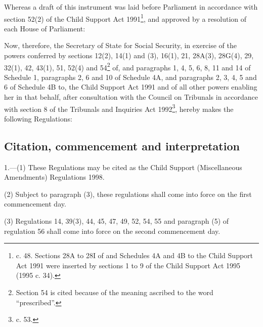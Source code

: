 \documentclass[12pt,a4paper]{article}
\title{\regstitle}
\author{S.I. 1998 No. 58}
\date{Made 15th January 1998\\Coming into force in accordance with regulation 1(2) and (3)}
\begin{document}
\maketitle

\noindent
Whereas a draft of this instrument was laid before Parliament in accordance with section 52(2) of the Child Support Act 1991\footnote{ c. 48. Sections 28A to 28I of and Schedules 4A and 4B to the Child Support Act 1991 were inserted by sections 1 to 9 of the Child Support Act 1995 (1995 c. 34).}, and approved by a resolution of each House of Parliament:

 Now, therefore, the Secretary of State for Social Security, in exercise of the powers conferred by sections 12(2), 14(1) and (3), 16(1), 21, 28A(3), 28G(4), 29, 32(1), 42, 43(1), 51, 52(4) and 54\footnote{\frenchspacing Section 54 is cited because of the meaning ascribed to the word “prescribed”.} of, and paragraphs 1, 4, 5, 6, 8, 11 and 14 of Schedule 1, paragraphs 2, 6 and 10 of Schedule 4A, and paragraphs 2, 3, 4, 5 and 6 of Schedule 4B to, the Child Support Act 1991 and of all other powers enabling her in that behalf, after consultation with the Council on Tribunals in accordance with section 8 of the Tribunals and Inquiries Act 1992\footnote{ c. 53.}, hereby makes the following Regulations:


{\sloppy

\tableofcontents

}

\bigskip

\setcounter{secnumdepth}{-2}

\subsection[1. Citation, commencement and interpretation]{Citation, commencement and interpretation}

1.—(1) These Regulations may be cited as the Child Support (Miscellaneous Amendments) Regulations 1998.

(2) Subject to paragraph (3), these regulations shall come into force on the first commencement day.

(3) Regulations 14, 39(3), 44, 45, 47, 49, 52, 54, 55 and paragraph (5) of regulation 56 shall come into force on the second commencement day.
\end{document}
